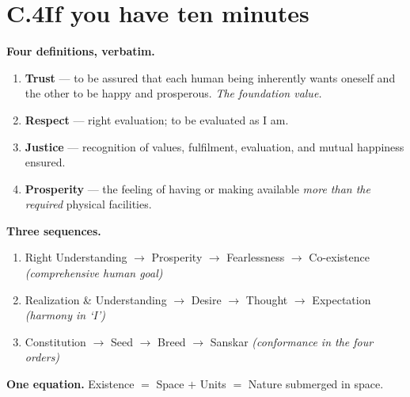 \section*{C.4\enspace If you have ten minutes}

\begin{keybox}
\textbf{Four definitions, verbatim.}
\begin{enumerate}[leftmargin=1.8em,itemsep=2pt,topsep=3pt]
\item \textbf{Trust} --- to be assured that each human being inherently wants
      oneself and the other to be happy and prosperous. \emph{The foundation
      value.}
\item \textbf{Respect} --- right evaluation; to be evaluated as I am.
\item \textbf{Justice} --- recognition of values, fulfilment, evaluation, and
      mutual happiness ensured.
\item \textbf{Prosperity} --- the feeling of having or making available
      \emph{more than the required} physical facilities.
\end{enumerate}

\vspace{3pt}
\textbf{Three sequences.}
\begin{enumerate}[leftmargin=1.8em,itemsep=2pt,topsep=3pt]
\item Right Understanding $\rightarrow$ Prosperity $\rightarrow$ Fearlessness
      $\rightarrow$ Co-existence \quad \emph{(comprehensive human goal)}
\item Realization \& Understanding $\rightarrow$ Desire $\rightarrow$ Thought
      $\rightarrow$ Expectation \quad \emph{(harmony in `I')}
\item Constitution $\rightarrow$ Seed $\rightarrow$ Breed $\rightarrow$
      Sanskar \quad \emph{(conformance in the four orders)}
\end{enumerate}

\vspace{3pt}
\textbf{One equation.} \quad Existence $=$ Space $+$ Units $=$ Nature
submerged in space.
\end{keybox}
